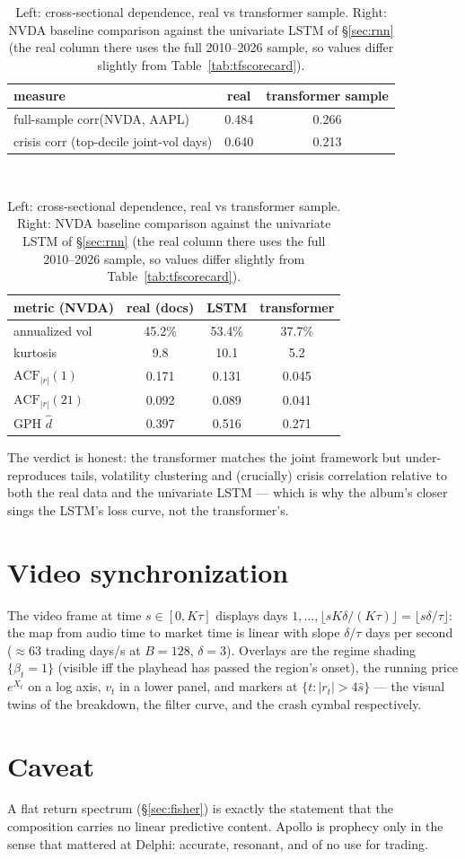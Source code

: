 \documentclass[11pt,a4paper]{article}
\begin{document}
\begin{table}[h]
\centering\small
\begin{tabular}{lcc}
\toprule
measure & real & transformer sample\\
\midrule
full-sample corr(NVDA, AAPL) & 0.484 & 0.266\\
crisis corr (top-decile joint-vol days) & 0.640 & 0.213\\
\bottomrule
\end{tabular}\\[10pt]
\begin{tabular}{lccc}
\toprule
metric (NVDA) & real (docs) & LSTM & transformer\\
\midrule
annualized vol & 45.2\% & 53.4\% & 37.7\%\\
kurtosis & 9.8 & 10.1 & 5.2\\
$\mathrm{ACF}_{|r|}(1)$ & 0.171 & 0.131 & 0.045\\
$\mathrm{ACF}_{|r|}(21)$ & 0.092 & 0.089 & 0.041\\
GPH $\hat d$ & 0.397 & 0.516 & 0.271\\
\bottomrule
\end{tabular}
\caption{Left: cross-sectional dependence, real vs transformer sample.
Right: NVDA baseline comparison against the univariate LSTM of
\S\ref{sec:rnn} (the real column there uses the full 2010--2026 sample, so
values differ slightly from Table~\ref{tab:tfscorecard}).}
\label{tab:tfcross}
\end{table}

The verdict is honest: the transformer matches the joint framework but
under-reproduces tails, volatility clustering and (crucially) crisis
correlation relative to both the real data and the univariate LSTM ---
which is why the album's closer sings the LSTM's loss curve, not the
transformer's.

\section{Video synchronization}

The video frame at time $s\in[0, K\tau]$ displays days
$1,\dots,\lfloor sK\delta/(K\tau)\rfloor = \lfloor s\delta/\tau \rfloor$: the
map from audio time to market time is linear with slope $\delta/\tau$ days per
second ($\approx 63$ trading days/s at $B=128$, $\delta=3$). Overlays are the
regime shading $\{\beta_t=1\}$ (visible iff the playhead has passed the region's
onset), the running price $e^{X_t}$ on a log axis, $v_t$ in a lower panel, and
markers at $\{t: |r_t|>4\hat s\}$ --- the visual twins of the breakdown, the
filter curve, and the crash cymbal respectively.

\section*{Caveat}
A flat return spectrum (\S\ref{sec:fisher}) is exactly the statement that the
composition carries no linear predictive content. Apollo is prophecy only in the
sense that mattered at Delphi: accurate, resonant, and of no use for trading.
\end{document}
